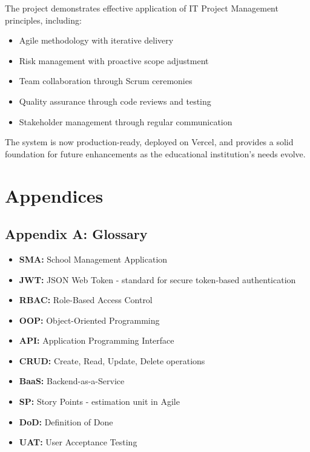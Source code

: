 \documentclass[12pt,a4paper]{article}
\begin{document}
The project demonstrates effective application of IT Project Management principles, including:
\begin{itemize}[noitemsep]
    \item Agile methodology with iterative delivery
    \item Risk management with proactive scope adjustment
    \item Team collaboration through Scrum ceremonies
    \item Quality assurance through code reviews and testing
    \item Stakeholder management through regular communication
\end{itemize}

The system is now production-ready, deployed on Vercel, and provides a solid foundation for future enhancements as the educational institution's needs evolve.

\section{Appendices}

\subsection{Appendix A: Glossary}

\begin{itemize}[noitemsep]
    \item \textbf{SMA:} School Management Application
    \item \textbf{JWT:} JSON Web Token - standard for secure token-based authentication
    \item \textbf{RBAC:} Role-Based Access Control
    \item \textbf{OOP:} Object-Oriented Programming
    \item \textbf{API:} Application Programming Interface
    \item \textbf{CRUD:} Create, Read, Update, Delete operations
    \item \textbf{BaaS:} Backend-as-a-Service
    \item \textbf{SP:} Story Points - estimation unit in Agile
    \item \textbf{DoD:} Definition of Done
    \item \textbf{UAT:} User Acceptance Testing
\end{itemize}
\end{document}
